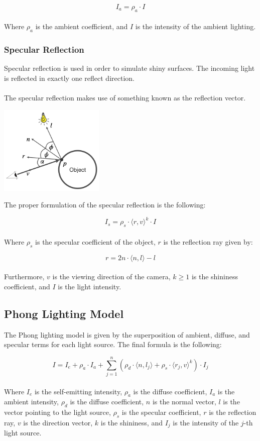 \documentclass{article}
\begin{document}
\[ I_a = \rho_a \cdot I \] \\
Where $\rho_a$ is the ambient coefficient, and $I$ is the intensity of the ambient lighting.

\subsubsection{Specular Reflection}
Specular reflection is used in order to simulate shiny surfaces. The incoming light is reflected in exactly one reflect direction. \\ \\
The specular reflection makes use of something known as the reflection vector.

\begin{center}
	\includegraphics[width=5cm]{specular_refl.png}
\end{center}
The proper formulation of the specular reflection is the following:

\[ I_s = \rho_s \cdot \langle r, v \rangle^k \cdot I \] \\
Where $\rho_s$ is the specular coefficient of the object, $r$ is the reflection ray given by:

\[ r = 2n \cdot \langle n, l \rangle - l \] \\
Furthermore, $v$ is the viewing direction of the camera, $k \geq 1$ is the shininess coefficient, and $I$ is the light intensity.

\subsection{Phong Lighting Model}
The Phong lighting model is given by the superposition of ambient, diffuse, and specular terms for each light source. The final formula is the following:

\[ I = I_e + \rho_a \cdot I_a + \sum^n_{j = 1} (\rho_d \cdot \langle n, l_j \rangle + \rho_s \cdot \langle r_j, v \rangle^k) \cdot I_j \] \\
Where $I_e$ is the self-emitting intensity, $\rho_a$ is the diffuse coefficient, $I_a$ is the ambient intensity, $\rho_d$ is the diffuse coefficient, $n$ is the normal vector, $l$ is the vector pointing to the light source, $\rho_s$ is the specular coefficient, $r$ is the reflection ray, $v$ is the direction vector, $k$ is the shininess, and $I_j$ is the intensity of the $j$-th light source.
\end{document}
